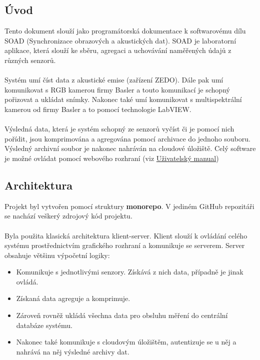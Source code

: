 \documentclass[12pt]{article}
\begin{document}
    \begin{teamwork}
        \section{Úvod}\label{sec:uvod}

        Tento dokument slouží jako programátorská dokumentace k softwarovému dílu SOAD (Synchronizace obrazových a akustických dat).
        SOAD je laboratorní aplikace, která slouží ke sběru, agregaci a uchovávání naměřených údajů z různých senzorů.
        \\
        \\
        Systém umí číst data z akustické emise (zařízení ZEDO). Dále pak umí komunikovat s RGB kamerou firmy Basler a touto komunikací
        je schopný pořizovat a ukládat snímky.
        Nakonec také umí komunikovat s multispektrální kamerou od firmy Basler a to pomocí technologie LabVIEW\@.
        \\
        \\
        Výsledná data, která je systém schopný ze senzorů vyčíst či je pomocí nich pořídit, jsou komprimována a agregována pomocí archivace
        do jednoho souboru.
        Výsledný archivní soubor je nakonec nahráván na cloudové úložiště.
        Celý software je možné ovládat pomocí webového rozhraní (viz \href{https://github.com/Prazdny-retezec/soad/blob/11-programatorska-dokumentace/docs/cz/user/tex/out/main.pdf}{Uživatelský manual})

        \subsection{Architektura}\label{subsec:architektura}

        Projekt byl vytvořen pomocí struktury \textbf{monorepo}.
        V jediném GitHub repozitáři se nachází veškerý zdrojový kód projektu.
        \\
        \\
        Byla použita klasická architektura klient-server.
        Klient slouží k ovládání celého systému prostřednictvím grafického rozhraní a komunikuje se serverem.
        Server obsahuje většinu výpočetní logiky:
        \begin{itemize}
            \item Komunikuje s jednotlivými senzory.
            Získává z nich data, případně je jinak ovládá.
            \item  Získaná data agreguje a komprimuje.
            \item Zároveň rovněž ukládá všechna data pro obsluhu měření do centrální databáze systému.
            \item Nakonec také komunikuje s cloudovým úložištěm, autentizuje se u něj a nahrává na něj výsledné archivy dat.
        \end{itemize}


\end{teamwork}
\end{document}
